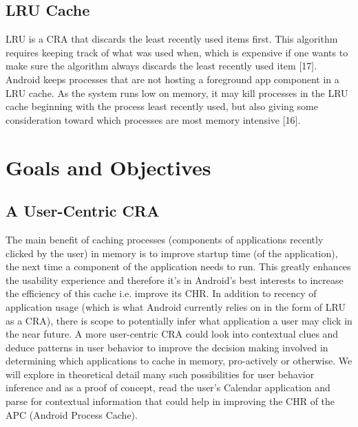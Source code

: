 \documentclass[12pt]{uthesis-v12}  %
\begin{document}
		\subsection{LRU Cache}
			LRU is a CRA that discards the least recently used items first. This algorithm requires keeping track of what was used when, which is expensive if one wants to make sure the algorithm always discards the least recently used item [17]. Android keeps processes that are not hosting a foreground app component in a LRU cache. As the system runs low on memory, it may kill processes in the LRU cache beginning with the process least recently used, but also giving some consideration toward which processes are most memory intensive [16].
			
	\section{Goals and Objectives}
		
		\subsection{A User-Centric CRA}
			The main benefit of caching processes (components of applications recently clicked by the user) in memory is to improve startup time (of the application), the next time a component of the application needs to run. This greatly enhances the usability experience and therefore it's in Android's best interests to increase the efficiency of this cache i.e. improve its CHR. In addition to recency of application usage (which is what Android currently relies on in the form of LRU as a CRA), there is scope to potentially infer what application a user may click in the near future. A more user-centric CRA could look into contextual clues and deduce patterns in user behavior to improve the decision making involved in determining which applications to cache in memory, pro-actively or otherwise. We will explore in theoretical detail many such possibilities for user behavior inference and as a proof of concept, read the user's Calendar  application and parse for contextual information that could help in improving the CHR of the APC (Android Process Cache). 
\end{document}

